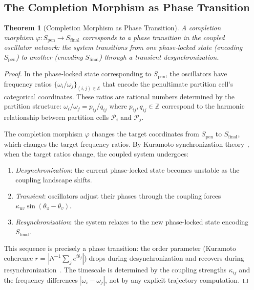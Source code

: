 \documentclass[twocolumn,10pt]{article}
\newtheorem{theorem}{Theorem}[section]
\theoremstyle{definition}
\newcommand{\Sfinal}{S_{\mathrm{final}}}
\newcommand{\Spen}{S_{\mathrm{pen}}}
\begin{document}
\subsection{The Completion Morphism as Phase Transition}

\begin{theorem}[Completion Morphism as Phase Transition]
\label{thm:morphism-phase-transition}
A completion morphism $\varphi: \Spen \to \Sfinal$ corresponds to a phase transition in the coupled oscillator network: the system transitions from one phase-locked state (encoding $\Spen$) to another (encoding $\Sfinal$) through a transient desynchronization.
\end{theorem}

\begin{proof}
In the phase-locked state corresponding to $\Spen$, the oscillators have frequency ratios $\{\omega_i/\omega_j\}_{(i,j) \in \mathcal{E}}$ that encode the penultimate partition cell's categorical coordinates. These ratios are rational numbers determined by the partition structure: $\omega_i/\omega_j = p_{ij}/q_{ij}$ where $p_{ij}, q_{ij} \in \mathbb{Z}$ correspond to the harmonic relationship between partition cells $\mathcal{P}_i$ and $\mathcal{P}_j$.

The completion morphism $\varphi$ changes the target coordinates from $\Spen$ to $\Sfinal$, which changes the target frequency ratios. By Kuramoto synchronization theory~\cite{kuramoto1984}, when the target ratios change, the coupled system undergoes:
\begin{enumerate}
\item \emph{Desynchronization}: the current phase-locked state becomes unstable as the coupling landscape shifts.
\item \emph{Transient}: oscillators adjust their phases through the coupling forces $\kappa_{uv}\sin(\theta_u - \theta_v)$.
\item \emph{Resynchronization}: the system relaxes to the new phase-locked state encoding $\Sfinal$.
\end{enumerate}
This sequence is precisely a phase transition: the order parameter (Kuramoto coherence $r = |N^{-1}\sum_j e^{i\theta_j}|$) drops during desynchronization and recovers during resynchronization~\cite{strogatz2003}. The timescale is determined by the coupling strengths $\kappa_{ij}$ and the frequency differences $|\omega_i - \omega_j|$, not by any explicit trajectory computation.
\end{proof}
\end{document}
